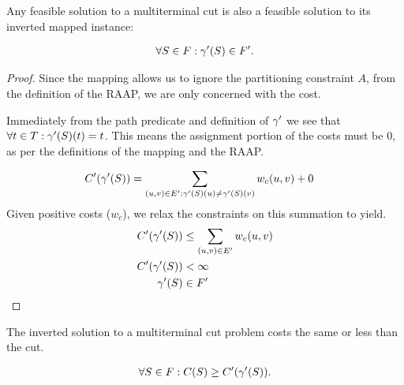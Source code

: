 \begin{lemma}
\label{INVERSEFEASIBLE}
Any feasible solution to a multiterminal cut is also a feasible solution to its inverted mapped instance:

\begin{align}
	\nonumber \forall S \in F : \gamma'(S) \in F'.
\end{align}
\end{lemma}

\begin{proof}
Since the mapping allows us to ignore the partitioning constraint $A$, from the definition of the RAAP, we are only concerned with the cost.

Immediately from the path predicate and definition of $\gamma'$ we see that $\forall t \in T : \gamma'(S)(t) = t$.
This means the assignment portion of the costs must be 0, as per the definitions of the mapping and the RAAP.

\begin{align}
	\nonumber C'(\gamma'(S)) & = \displaystyle\sum\limits_{(u,v) \in E' : \gamma'(S)(u) \neq \gamma'(S)(v)} w_c(u,v) + 0
\end{align}
\noindent Given positive costs ($w_c$), we relax the constraints on this summation to yield.
\begin{align}
	\nonumber C'(\gamma'(S)) & \leq \displaystyle\sum\limits_{(u,v) \in E'} w_c(u,v) \\
	\nonumber C'(\gamma'(S)) & < \infty \\
	\nonumber \gamma'(S) & \in F'
\end{align}
\end{proof}

\begin{lemma}
\label{INVERSECOST}
The inverted solution to a multiterminal cut problem costs the same or less than the cut.

\begin{align}
	\nonumber \forall S \in F : C(S) \geq C'(\gamma'(S)).
\end{align}
\end{lemma}

